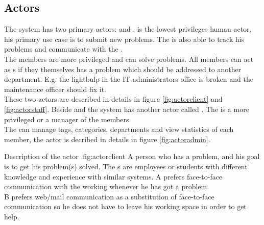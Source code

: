 \subsection{Actors}
\label{sec:actors}

The system has two primary actors:   \aclient{} and \astaff. \aclient[c] is the lowest privileges human actor, his primary use case is to submit new problems. The \aclient[] is also able to track his problems and communicate with the \astaff[]. \\

The \astaff{} members are more privileged and can solve problems. 
All \astaff{} members can act as \aclient{}s if they themselves has a problem which should be addressed to another department. 
E.g. the lightbulp in the IT-administrators office is broken and the maintenance officer should fix it. \\

These two actors are described in details in figure \ref{fig:actorclient} and \ref{fig:actorstaff}. 
Beside \astaff{} and \aclient{} the system has another actor called \sadmin{}. 
The \sadmin{} is a more privileged \astaff{} or a manager of the \astaff members. \\

The \sadmin{} can manage tags, categories, departments and view statistics of each \astaff member, the actor \admin[] is decribed in details in figure \ref{fig:actoradmin}.

\begin{sadlist}[h]{\Aclient}{Description of the actor \aclient.}{fig:actorclient}
 A person who has a problem, and his goal is to get his problem(s) solved.
 The \aclient{}s are employees or students with different knowledge and experience with similar systems.%
 \Aclient{} A prefers face-to-face communication with the working \astaff{} whenever he has got a problem.\\
\aclient[c] B prefers web/mail communication as a substitution of face-to-face communication so he does not have to leave his working space in order to get help. 
\end{sadlist} 

